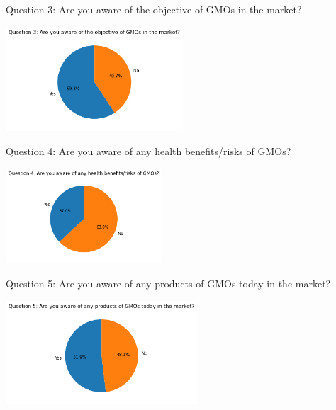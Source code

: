 \documentclass[11pt]{article}
\begin{document}
    \newpage
    Question 3: Are you aware of the objective of GMOs in the market?
    \begin{center}
        \includegraphics[width=250]{ChanR EDA/q3}
    \end{center}

    Question 4: Are you aware of any health benefits/risks of GMOs?
    \begin{center}
        \includegraphics[width=220]{ChanR EDA/q4}
    \end{center}

    Question 5: Are you aware of any products of GMOs today in the market?
    \begin{center}
        \includegraphics[width=270]{ChanR EDA/q5}
    \end{center}
\end{document}
